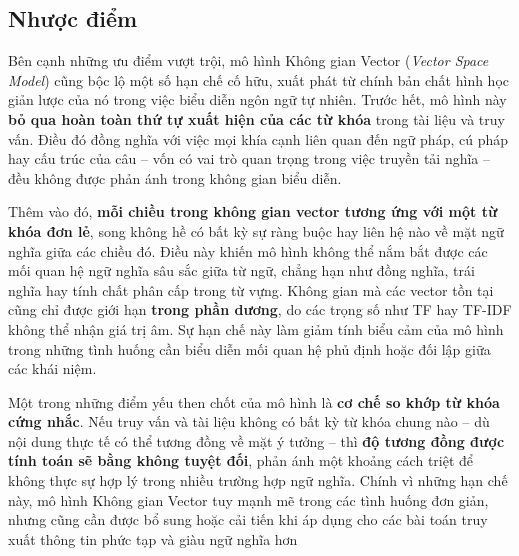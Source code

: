 \subsection{Nhược điểm}
Bên cạnh những ưu điểm vượt trội, mô hình Không gian Vector (\textit{Vector Space Model}) cũng bộc lộ một số hạn chế cố hữu, xuất phát từ chính bản chất hình học giản lược của nó trong việc biểu diễn ngôn ngữ tự nhiên. Trước hết, mô hình này \textbf{bỏ qua hoàn toàn thứ tự xuất hiện của các từ khóa} trong tài liệu và truy vấn. Điều đó đồng nghĩa với việc mọi khía cạnh liên quan đến ngữ pháp, cú pháp hay cấu trúc của câu -- vốn có vai trò quan trọng trong việc truyền tải nghĩa -- đều không được phản ánh trong không gian biểu diễn.

Thêm vào đó, \textbf{mỗi chiều trong không gian vector tương ứng với một từ khóa đơn lẻ}, song không hề có bất kỳ sự ràng buộc hay liên hệ nào về mặt ngữ nghĩa giữa các chiều đó. Điều này khiến mô hình không thể nắm bắt được các mối quan hệ ngữ nghĩa sâu sắc giữa từ ngữ, chẳng hạn như đồng nghĩa, trái nghĩa hay tính chất phân cấp trong từ vựng. Không gian mà các vector tồn tại cũng chỉ được giới hạn \textbf{trong phần dương}, do các trọng số như TF hay TF-IDF không thể nhận giá trị âm. Sự hạn chế này làm giảm tính biểu cảm của mô hình trong những tình huống cần biểu diễn mối quan hệ phủ định hoặc đối lập giữa các khái niệm.

Một trong những điểm yếu then chốt của mô hình là \textbf{cơ chế so khớp từ khóa cứng nhắc}. Nếu truy vấn và tài liệu không có bất kỳ từ khóa chung nào -- dù nội dung thực tế có thể tương đồng về mặt ý tưởng -- thì \textbf{độ tương đồng được tính toán sẽ bằng không tuyệt đối}, phản ánh một khoảng cách triệt để không thực sự hợp lý trong nhiều trường hợp ngữ nghĩa. Chính vì những hạn chế này, mô hình Không gian Vector tuy mạnh mẽ trong các tình huống đơn giản, nhưng cũng cần được bổ sung hoặc cải tiến khi áp dụng cho các bài toán truy xuất thông tin phức tạp và giàu ngữ nghĩa hơn
